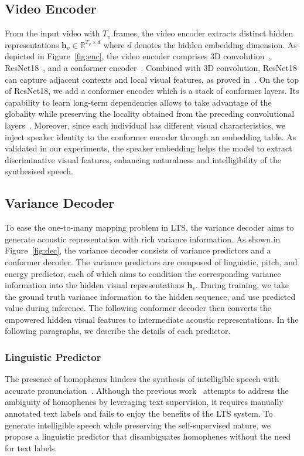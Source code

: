 \documentclass[letterpaper]{article} %
\begin{document}
\subsection{Video Encoder}
From the input video with $T_v$ frames, the video encoder extracts distinct hidden representations $\boldsymbol{h}_v\in\mathbb{R}^{T_v\times d}$ where $d$ denotes the hidden embedding dimension.
As depicted in Figure~\ref{fig:enc}, the video encoder comprises 3D convolution~\cite{ji20123d}, ResNet18~\cite{he2016deep}, and a conformer encoder~\cite{gulati2020conformer}.
Combined with 3D convolution, ResNet18 can capture adjacent contexts and local visual features, as proved in~\cite{petridis2018end,ma2022visual}.
On the top of ResNet18, we add a conformer encoder which is a stack of conformer layers.
Its capability to learn long-term dependencies allows to take advantage of the globality while preserving the locality obtained from the preceding convolutional layers~\cite{guo2022cmt}.
Moreover, since each individual has different visual characteristics, we inject speaker identity to the conformer encoder through an embedding table.
As validated in our experiments, the speaker embedding helps the model to extract discriminative visual features, enhancing naturalness and intelligibility of the synthesised speech.

\subsection{Variance Decoder}
To ease the one-to-many mapping problem in LTS, the variance decoder aims to generate acoustic representation with rich variance information.
As shown in Figure~\ref{fig:dec}, the variance decoder consists of variance predictors and a conformer decoder.
The variance predictors are composed of linguistic, pitch, and energy predictor, each of which aims to condition the corresponding variance information into the hidden visual representations $\boldsymbol{h}_v$.
During training, we take the ground truth variance information to the hidden sequence, and use predicted value during inference.
The following conformer decoder then converts the empowered hidden visual features to intermediate acoustic representations.
In the following paragraphs, we describe the details of each predictor.


\subsubsection{Linguistic Predictor}
The presence of homophenes hinders the synthesis of intelligible speech with accurate pronunciation~\cite{ephrat2017vid2speech}.
Although the previous work~\cite{kim2023lip} attempts to address the ambiguity of homophenes by leveraging text supervision, it requires manually annotated text labels and fails to enjoy the benefits of the LTS system.
To generate intelligible speech while preserving the self-supervised nature, we propose a linguistic predictor that disambiguates homophenes without the need for text labels.
\end{document}
